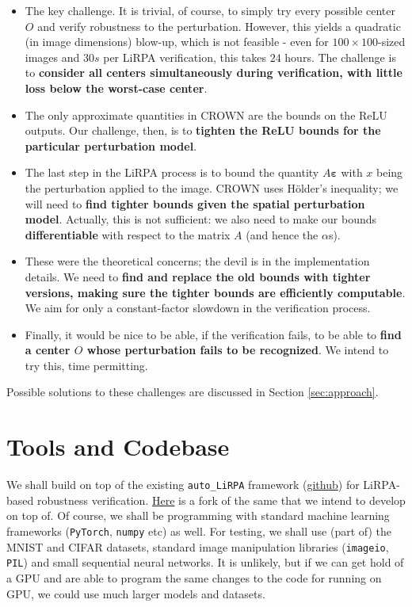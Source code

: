 \documentclass{article}
\begin{document}
\begin{itemize}
    \item The key challenge. It is trivial, of course, to simply try every possible center $O$ and verify robustness to the perturbation. However, this yields a quadratic (in image dimensions) blow-up, which is not feasible - even for $100\times 100$-sized images and $30s$ per LiRPA verification, this takes $24$ hours. The challenge is to \textbf{consider all centers simultaneously during verification, with little loss below the worst-case center}.
    \item The only approximate quantities in CROWN are the bounds on the ReLU outputs. Our challenge, then, is to \textbf{tighten the ReLU bounds for the particular perturbation model}.
    \item The last step in the LiRPA process is to bound the quantity $A\bm \varepsilon$ with $x$ being the perturbation applied to the image. CROWN uses Hölder's inequality; we will need to \textbf{find tighter bounds given the spatial perturbation model}. Actually, this is not sufficient: we also need to make our bounds \textbf{differentiable} with respect to the matrix $A$ (and hence the $\alpha$s).
    \item These were the theoretical concerns; the devil is in the implementation details. We need to \textbf{find and replace the old bounds with tighter versions, making sure the tighter bounds are efficiently computable}. We aim for only a constant-factor slowdown in the verification process.
    \item Finally, it would be nice to be able, if the verification fails, to be able to \textbf{find a center $O$ whose perturbation fails to be recognized}. We intend to try this, time permitting.
\end{itemize}

Possible solutions to these challenges are discussed in Section \ref{sec:approach}.

\section{Tools and Codebase}

We shall build on top of the existing \texttt{auto\_LiRPA} framework (\href{https://github.com/Verified-Intelligence/auto_LiRPA}{github}) for LiRPA-based robustness verification. \href{https://github.com/mathismusic/auto_LiRPA_proj}{Here} is a fork of the same that we intend to develop on top of. Of course, we shall be programming with standard machine learning frameworks (\texttt{PyTorch}, \texttt{numpy} etc) as well. For testing, we shall use (part of) the MNIST and CIFAR datasets, standard image manipulation libraries (\texttt{imageio}, \texttt{PIL}) and small sequential neural networks. It is unlikely, but if we can get hold of a GPU and are able to program the same changes to the code for running on GPU, we could use much larger models and datasets.
\end{document}
